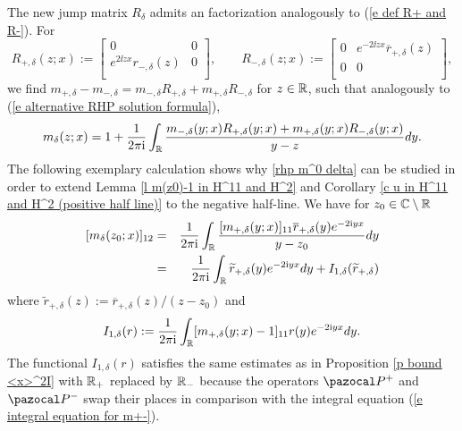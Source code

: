 The new jump matrix $R_{\delta}$ admits an factorization analogously to (\ref{e def R+ and R-}). For
\begin{equation}\label{e def R+ and R- delta}
    R_{+,\delta}(z;x):=
                  \left[
                    \begin{array}{cc}
                       0 & 0 \\
                       e^{2\ii zx}r_{-,\delta}(z) & 0 \\
                    \end{array}
                  \right],\qquad
    R_{-,\delta}(z;x):=
                  \left[
                    \begin{array}{cc}
                       0 & e^{-2\ii zx}\overline{r}_{+,\delta}(z) \\
                       0 & 0 \\
                    \end{array}
                  \right],
\end{equation}
we find
$m_{+,\delta} -m_{-,\delta}=m_{-,\delta}R_{+,\delta} +m_{+,\delta}R_{-,\delta}$ for $z\in \mathbb R$, such that analogously to (\ref{e alternative RHP solution formula}),
\begin{equation*}
    m_{\delta}(z;x)=1+\frac{1}{2\pi\mathrm{i}}\int_{\mathbb R} \frac{m_{-,\delta}(y;x)R_{+,\delta}(y;x)+ m_{+,\delta}(y;x)R_{-,\delta}(y;x)}{y-z}dy.
\end{equation*}
The following exemplary calculation shows why \rh \ref{rhp m^0 delta} can be studied in order to extend Lemma \ref{l m(z0)-1 in H^11 and H^2} and Corollary \ref{c u in H^11 and H^2 (positive half line)} to the negative half-line. We have for $z_0\in\mathbb C\setminus\mathbb R$
\begin{eqnarray*}
  [m_{\delta}(z_0;x)]_{12}&=& \frac{1}{2\pi\mathrm{i}} \int_{\mathbb R}\frac{[m_{+,\delta}(y;x)]_{11} \overline{r}_{+,\delta}(y) e^{-2\mathrm{i} yx}}{y-z_0}dy \\
   &=&  \frac{1}{2\pi\mathrm{i}} \int_{\mathbb R}\widetilde{r}_{+,\delta}(y) e^{-2\mathrm{i} yx}dy+I_{1,\delta}(\widetilde{r}_{+,\delta})
\end{eqnarray*}
where $\widetilde{r}_{+,\delta}(z):= \overline{r}_{+,\delta}(z)/(z-z_0)$ and
\begin{equation*}
    I_{1,\delta}(r):=\frac{1}{2\pi\mathrm{i}} \int_{\mathbb R}[m_{+,\delta}(y;x)-1]_{11} r(y) e^{-2\mathrm{i} yx}dy.
\end{equation*}
The functional $I_{1,\delta}(r)$ satisfies the same estimates as in Proposition \ref{p bound <x>^2I} with $\mathbb R_+$ replaced by $\mathbb R_-$ because the operators $\Pp$ and $\Pm$ swap their places in comparison with the integral equation (\ref{e integral equation for m+-}).
